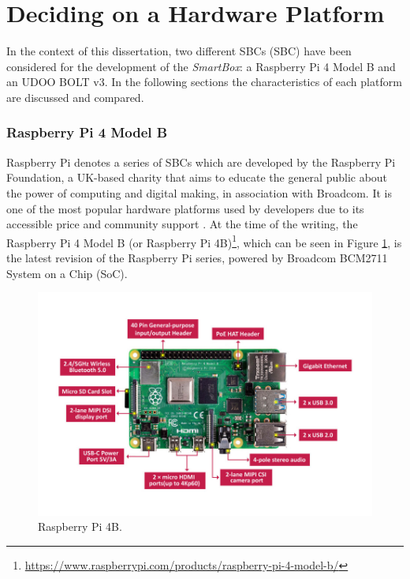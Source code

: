 \section{Deciding on a Hardware Platform}

In the context of this dissertation, two different \acl{SBC}s (\acs{SBC}) have been considered for the development of the \textit{SmartBox}: a Raspberry Pi 4 Model B and an UDOO BOLT v3. In the following sections the characteristics of each platform are discussed and compared. 

\subsubsection{Raspberry Pi 4 Model B}

Raspberry Pi denotes a series of \acs{SBC}s which are developed by the Raspberry Pi Foundation, a UK-based charity that aims to educate the general public about the power of computing and digital making, in association with Broadcom. It is one of the most popular hardware platforms used by developers due to its accessible price and community support \cite{jain2021introduction}.
At the time of the writing, the Raspberry Pi 4 Model B (or Raspberry Pi 4B)\footnote{\url{https://www.raspberrypi.com/products/raspberry-pi-4-model-b/}}, which can be seen in Figure \ref{fig:raspberrypi-image}, is the latest revision of the Raspberry Pi series, powered by Broadcom BCM2711 System on a Chip (SoC).

\begin{figure}[H]
    \centering
    \includegraphics[width=\linewidth]{images/raspberry-4-modele-b-4go.jpg}
    \caption{Raspberry Pi 4B.}
    \label{fig:raspberrypi-image}
\end{figure}

